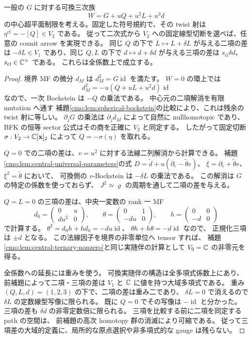 \begin{lemma}[可換実族は必要な三段の差を実現する]
\label{euk:lem:commutative-reference}
一般の $G$ に対する可換三次族
\[
                    W=G+uQ+u^2L+u^3d
\]
の中心超平面制限を考える。固定した符号規約で、その twist 射は
$\eta^{\mathrm{cl}}=-[Q]\in V_2$ である。
従って二次式から $V_2$ への固定線型切断を選べば、任意の counit arrow を実現できる。
同じ $Q$ の下で $L\mapsto L+\delta L$ が与える二項の差は
$-\delta L\in V_1$ であり、同じ $Q,L$ の下で
$d\mapsto d+\delta d$ が与える三項の差は
$s_{\mathrm{cl}}\delta d$、$s_{\mathrm{cl}}\in\mathbb C^\times$ である。
これらは全係数上で成立する。
\end{lemma}

\begin{proof}
境界 MF の微分 $d_M$ は $d_M^2=G\operatorname{id}$ を満たす。
$W=0$ の環上では
\[
              d_M^2=-u(Q+uL+u^2d)\operatorname{id}
\]
なので、一次 Bockstein は $-Q$ の乗法である。
中心元の二項解消を有限 mutation へ通す
補題\ref{cmo:lem:spherical-bockstein}の比較により、これは残余の twist 射に等しい。
$\partial_jG$ の乗法は $\partial_jd_M$ によって自然に nullhomotopic であり、
BFK の恒等 sector 公式はその商を正確に $V_2$ と同定する。
したがって固定切断 $\sigma:V_2\to\mathbb C[\mathbf x]_2$ によって
$Q=-\sigma(\eta)$ を取れる。

$Q=0$ での二項の差は、$v=u^2$ に対する法線二列解消から計算できる。
補題\ref{cmo:lem:central-universal-parameters}の式
$D=\widetilde d+u(\partial_e-\widetilde\theta e)$、
$\xi=\partial_e+\widetilde\theta e$、$\xi^2=\widetilde\theta$ において、
可換側の $v$-Bockstein は $-\delta L$ の乗法である。
この解消は $G$ の特定の係数を使っておらず、
$J^2\simeq\varrho$ の周期を通して二項の差を与える。

$Q=L=0$ の三項の差は、中央一変数の rank 一 MF
\[
 d_0=\begin{pmatrix}0&u\\du^2&0\end{pmatrix},\qquad
 \theta=\begin{pmatrix}0&1\\-du&0\end{pmatrix},\qquad
 h=\begin{pmatrix}0&0\\-d&0\end{pmatrix}
\]
で計算する。
$\theta^2=d_0h+hd_0=-du\operatorname{id}$、
$\theta h+h\theta=-d\operatorname{id}$ なので、
正規化三項は $\pm d$ となる。
この法線因子を境界の非零単位へ tensor すれば、
補題\ref{cmo:lem:central-ternary-nonzero}と同じ実随伴の計算として
$V_0=\mathbb C$ の非零元を得る。

全係数への延長には重みを使う。
可換実随伴の構造は全多項式係数上にあり、前補題によって二項・三項の差は
$V_1$ と $\mathbb C$ に値を持つ大域多項式である。
重み $(Q,L,d)=(1,2,3)$ の下で、二項の差は重み二であり、
$\delta L=0$ で消えるので $\delta L$ の定数線型写像に限られる。
既に $Q=0$ でその写像は $-\operatorname{id}$ と分かった。
三項の差も $\delta d$ の非零定数倍に限られる。
三項を比較する前に二項を同定する path の空間は、
前補題の高次 homotopy 群の消滅により可縮である。
従って三項差の大域的定義に、局所的な原点選択や非多項式的な gauge は残らない。
\end{proof}

